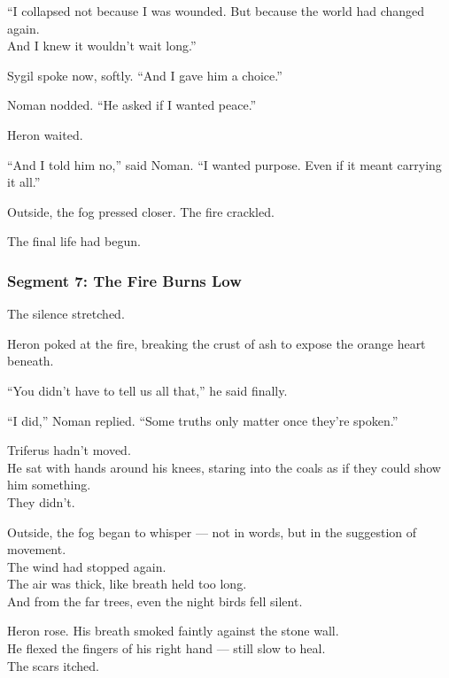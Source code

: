 \documentclass[9pt]{article}
\begin{document}
\vspace{1em}

“I collapsed not because I was wounded. But because the world had changed again.\\
And I knew it wouldn’t wait long.”

\vspace{1em}

Sygil spoke now, softly. “And I gave him a choice.”

Noman nodded. “He asked if I wanted peace.”

Heron waited.

“And I told him no,” said Noman. “I wanted purpose. Even if it meant carrying it all.”

\vspace{1em}

Outside, the fog pressed closer. The fire crackled.

The final life had begun.

\newpage

\subsubsection*{Segment 7: The Fire Burns Low}

The silence stretched.

Heron poked at the fire, breaking the crust of ash to expose the orange heart beneath.

“You didn’t have to tell us all that,” he said finally.

“I did,” Noman replied. “Some truths only matter once they’re spoken.”

\vspace{1em}

Triferus hadn’t moved.\\
He sat with hands around his knees, staring into the coals as if they could show him something.\\
They didn’t.

Outside, the fog began to whisper — not in words, but in the suggestion of movement.\\
The wind had stopped again.\\
The air was thick, like breath held too long.\\
And from the far trees, even the night birds fell silent.

Heron rose. His breath smoked faintly against the stone wall.\\
He flexed the fingers of his right hand — still slow to heal.\\
The scars itched.
\end{document}
